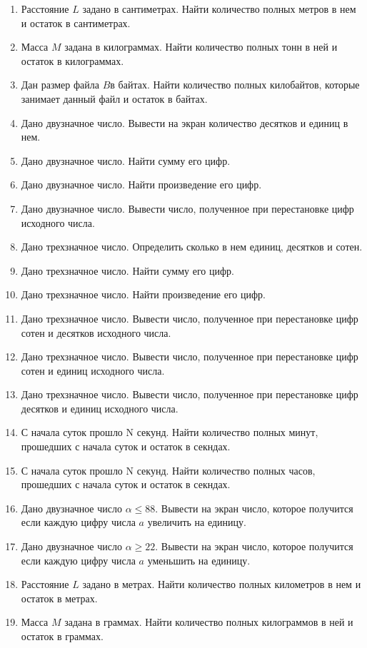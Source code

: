 \begin{enumerate}
\item Расстояние $L$ задано в сантиметрах. Найти количество полных метров в нем и остаток в
сантиметрах.
\item Масса $M$ задана в килограммах. Найти количество полных тонн в ней и остаток в килограммах.
\item Дан размер файла $B$в байтах. Найти количество полных килобайтов, которые занимает данный файл
и остаток в байтах.
\item Дано двузначное число. Вывести на экран количество десятков и единиц в нем.
\item Дано двузначное число. Найти сумму его цифр.
\item Дано двузначное число. Найти произведение его цифр.
\item Дано двузначное число. Вывести число, полученное при перестановке цифр исходного числа.
\item Дано трехзначное число. Определить сколько в нем единиц, десятков и сотен.
\item Дано трехзначное число. Найти сумму его цифр.
\item Дано трехзначное число. Найти произведение его цифр.
\item Дано трехзначное число. Вывести число, полученное при перестановке цифр сотен и десятков исходного числа.
\item Дано трехзначное число. Вывести число, полученное при перестановке цифр сотен и единиц исходного числа.
\item Дано трехзначное число. Вывести число, полученное при перестановке цифр десятков и единиц исходного числа.
\item С начала суток прошло N секунд. Найти количество полных минут, прошедших с начала суток и остаток в секндах.
\item С начала суток прошло N секунд. Найти количество полных часов, прошедших с начала суток и остаток в секндах.
\item Дано двузначное число $\alpha\leqslant 88$. Вывести на экран число, которое получится если каждую цифру числа
$a$ увеличить на единицу.
\item Дано двузначное число $\alpha\geqslant 22$. Вывести на экран число, которое получится если каждую цифру числа
$a$ уменьшить на единицу.
\item Расстояние $L$ задано в метрах. Найти количество полных километров в нем и остаток в метрах.
\item Масса $M$ задана в граммах. Найти количество полных килограммов в ней и остаток в граммах.

\end{enumerate}
